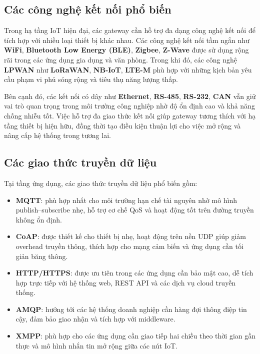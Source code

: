         \subsection{Các công nghệ kết nối phổ biến}
            Trong hạ tầng IoT hiện đại, các gateway cần hỗ trợ đa dạng công nghệ kết nối để tích hợp với nhiều loại thiết bị khác nhau. Các công nghệ kết nối tầm ngắn như \textbf{WiFi}, \textbf{Bluetooth Low Energy (BLE)}, \textbf{Zigbee}, \textbf{Z-Wave} được sử dụng rộng rãi trong các ứng dụng gia dụng và văn phòng. Trong khi đó, các công nghệ \textbf{LPWAN} như \textbf{LoRaWAN}, \textbf{NB-IoT}, \textbf{LTE-M} phù hợp với những kịch bản yêu cầu phạm vi phủ sóng rộng và tiêu thụ năng lượng thấp.

            Bên cạnh đó, các kết nối có dây như \textbf{Ethernet}, \textbf{RS-485}, \textbf{RS-232}, \textbf{CAN} vẫn giữ vai trò quan trọng trong môi trường công nghiệp nhờ độ ổn định cao và khả năng chống nhiễu tốt. Việc hỗ trợ đa giao thức kết nối giúp gateway tương thích với hạ tầng thiết bị hiện hữu, đồng thời tạo điều kiện thuận lợi cho việc mở rộng và nâng cấp hệ thống trong tương lai.
        \subsection{Các giao thức truyền dữ liệu}
            Tại tầng ứng dụng, các giao thức truyền dữ liệu phổ biến gồm:
            \begin{itemize}
                \item \textbf{MQTT}: phù hợp nhất cho môi trường hạn chế tài nguyên nhờ mô hình publish--subscribe nhẹ, hỗ trợ cơ chế QoS và hoạt động tốt trên đường truyền không ổn định.
                \item \textbf{CoAP}: được thiết kế cho thiết bị nhẹ, hoạt động trên nền UDP giúp giảm overhead truyền thông, thích hợp cho mạng cảm biến và ứng dụng cần tối giản băng thông.
                \item \textbf{HTTP/HTTPS}: được ưu tiên trong các ứng dụng cần bảo mật cao, dễ tích hợp trực tiếp với hệ thống web, REST API và các dịch vụ cloud truyền thống.
                \item \textbf{AMQP}: hướng tới các hệ thống doanh nghiệp cần hàng đợi thông điệp tin cậy, đảm bảo giao nhận và tích hợp với middleware.
                \item \textbf{XMPP}: phù hợp cho các ứng dụng cần giao tiếp hai chiều theo thời gian gần thực và mô hình nhắn tin mở rộng giữa các nút IoT.
            \end{itemize}
